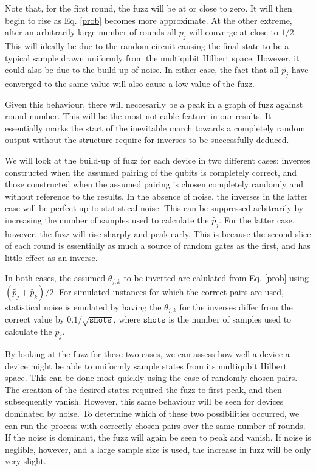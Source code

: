 \documentclass[aps,prl,twocolumn,showpacs,preprintnumbers]{revtex4-1}
\begin{document}
Note that, for the first round, the fuzz will be at or close to zero. It will then begin to rise as Eq. \ref{prob} becomes more approximate. At the other extreme, after an arbitrarily large number of rounds all $\tilde{p_j}$ will converge at close to $1/2$. This will ideally be due to the random circuit causing the final state to be a typical sample drawn uniformly from the multiqubit Hilbert space. However, it could also be due to the build up of noise. In either case, the fact that all $\tilde{p_j}$ have converged to the same value will also cause a low value of the fuzz.

Given this behaviour, there will neccesarily be a peak in a graph of fuzz against round number. This will be the most noticable feature in our results. It essentially marks the start of the inevitable march towards a completely random output without the structure require for inverses to be successfully deduced.

We will look at the build-up of fuzz for each device in two different cases: inverses constructed when the assumed pairing of the qubits is completely correct, and those constructed when the assumed pairing is chosen completely randomly and without reference to the results. In the absence of noise, the inverses in the latter case will be perfect up to statistical noise. This can be suppressed arbitrarily by increasing the number of samples used to calculate the $\tilde{p_j}$. For the latter case, however, the fuzz will rise sharply and peak early. This is because the second slice of each round is essentially as much a source of random gates as the first, and has little effect as an inverse.

In both cases, the assumed $\theta_{j,k}$ to be inverted are calulated from Eq. \ref{prob} using $(\tilde{p_j}+\tilde{p_k})/2$. For simulated instances for which the correct pairs are used, statistical noise is emulated by having the $\theta_{j,k}$ for the inverses differ from the correct value by $0.1/\sqrt{\mathtt{shots}}$, where $\mathtt{shots}$ is the number of samples used to calculate the $\tilde{p_j}$.

By looking at the fuzz for these two cases, we can assess how well a device a device might be able to uniformly sample states from its multiqubit Hilbert space. This can be done most quickly using the case of randomly chosen pairs. The creation of the desired states required the fuzz to first peak, and then subsequently vanish. However, this same behaviour will be seen for devices dominated by noise. To determine which of these two possibilities occurred, we can run the process with correctly chosen pairs over the same number of rounds. If the noise is dominant, the fuzz will again be seen to peak and vanish. If noise is neglible, however, and a large sample size is used, the increase in fuzz will be only very slight.
\end{document}
